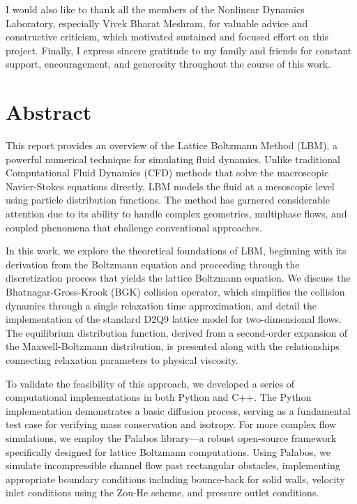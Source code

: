 \documentclass[12pt, a4paper]{report}
\begin{document}
I would also like to thank all the members of the Nonlinear Dynamics Laboratory, especially Vivek Bharat Meshram, for valuable advice and constructive criticism, which motivated sustained and focused effort on this project. Finally, I express sincere gratitude to my family and friends for constant support, encouragement, and generosity throughout the course of this work.

\clearpage
\addtocounter{page}{1}

\chapter*{Abstract}

\vspace{1cm}

This report provides an overview of the Lattice Boltzmann Method (LBM), a powerful numerical technique for simulating fluid dynamics. Unlike traditional Computational Fluid Dynamics (CFD) methods that solve the macroscopic Navier-Stokes equations directly, LBM models the fluid at a mesoscopic level using particle distribution functions. The method has garnered considerable attention due to its ability to handle complex geometries, multiphase flows, and coupled phenomena that challenge conventional approaches.

In this work, we explore the theoretical foundations of LBM, beginning with its derivation from the Boltzmann equation and proceeding through the discretization process that yields the lattice Boltzmann equation. We discuss the Bhatnagar-Gross-Krook (BGK) collision operator, which simplifies the collision dynamics through a single relaxation time approximation, and detail the implementation of the standard D2Q9 lattice model for two-dimensional flows. The equilibrium distribution function, derived from a second-order expansion of the Maxwell-Boltzmann distribution, is presented along with the relationships connecting relaxation parameters to physical viscosity.

To validate the feasibility of this approach, we developed a series of computational implementations in both Python and C++. The Python implementation demonstrates a basic diffusion process, serving as a fundamental test case for verifying mass conservation and isotropy. For more complex flow simulations, we employ the Palabos library—a robust open-source framework specifically designed for lattice Boltzmann computations. Using Palabos, we simulate incompressible channel flow past rectangular obstacles, implementing appropriate boundary conditions including bounce-back for solid walls, velocity inlet conditions using the Zou-He scheme, and pressure outlet conditions.
\end{document}
